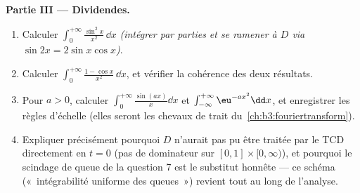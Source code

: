 \begin{problem}
\medskip
\noindent\textbf{Partie III --- Dividendes.}
\begin{enumerate}[resume]
  \item Calculer $\int_0^{+\infty}\frac{\sin^2x}{x^2}\,\dd
        x$ \emph{(intégrer par parties et se ramener à $D$
        via $\sin 2x = 2\sin x\cos x$)}.
  \item Calculer $\int_0^{+\infty}\frac{1 -
        \cos x}{x^2}\,\dd x$, et vérifier la cohérence des
        deux résultats.
  \item Pour $a > 0$, calculer
        $\int_0^{+\infty}\frac{\sin(ax)}x\dd x$ et
        $\int_{-\infty}^{+\infty}\eu^{-ax^2}\dd x$, et
        enregistrer les règles d'échelle (elles seront les
        chevaux de trait du~\cref{ch:b3:fouriertransform}).
  \item Expliquer précisément pourquoi $D$ n'aurait pas pu
        être traitée par le TCD directement en $t = 0$
        (pas de dominateur  sur
        $[0,1]\times[0,\infty)$), et pourquoi le scindage
        de queue de la question 7 est le substitut honnête
        --- ce schéma («~intégrabilité uniforme des
        queues~») revient tout au long de l'analyse.
\end{enumerate}


\end{problem}

